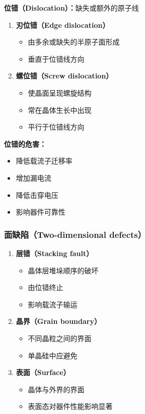 \documentclass[UTF8,12pt,a4paper]{ctexart}
\begin{document}
\textbf{位错（Dislocation）：}缺失或额外的原子线

\begin{enumerate}
    \item \textbf{刃位错（Edge dislocation）}
    \begin{itemize}
        \item 由多余或缺失的半原子面形成
        \item 垂直于位错线方向
    \end{itemize}
    
    \item \textbf{螺位错（Screw dislocation）}
    \begin{itemize}
        \item 使晶面呈现螺旋结构
        \item 常在晶体生长中出现
        \item 平行于位错线方向
    \end{itemize}
\end{enumerate}

\textbf{位错的危害：}
\begin{itemize}
    \item 降低载流子迁移率
    \item 增加漏电流
    \item 降低击穿电压
    \item 影响器件可靠性
\end{itemize}

\subsubsection{面缺陷（Two-dimensional defects）}

\begin{enumerate}
    \item \textbf{层错（Stacking fault）}
    \begin{itemize}
        \item 晶体层堆垛顺序的破坏
        \item 由位错终止
        \item 影响载流子输运
    \end{itemize}
    
    \item \textbf{晶界（Grain boundary）}
    \begin{itemize}
        \item 不同晶粒之间的界面
        \item 单晶硅中应避免
    \end{itemize}
    
    \item \textbf{表面（Surface）}
    \begin{itemize}
        \item 晶体与外界的界面
        \item 表面态对器件性能影响显著
    \end{itemize}
\end{enumerate}
\end{document}
